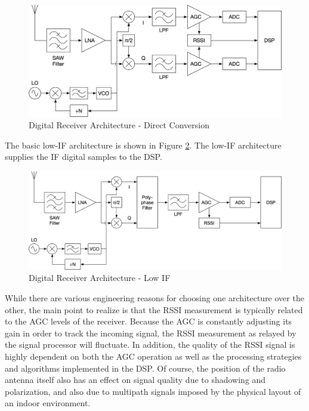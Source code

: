 \documentclass[12pt]{article}
\begin{document}
\begin{figure}[ht]
    \centering
    \includegraphics[width=1.0\textwidth]{RX-Arch-Direct.png}
    \caption{Digital Receiver Architecture - Direct Conversion}
    \label{fig:rx-arch-direct}
\end{figure}

The basic low-IF architecture is shown in Figure \ref{fig:rx-arch-low-if}. The low-IF
architecture supplies the IF digital samples to the DSP.

\begin{figure}[ht]
    \centering
    \includegraphics[width=1.0\textwidth]{RX-Arch-Low-IF.png}
    \caption{Digital Receiver Architecture - Low IF}
    \label{fig:rx-arch-low-if}
\end{figure}

While there are various engineering reasons for choosing one architecture over the other,
the main point to realize is that the RSSI measurement is typically related to the AGC
levels of the receiver. Because the AGC is constantly adjusting its gain in order to
track the incoming signal, the RSSI measurement as relayed by the signal processor will
fluctuate. In addition, the quality of the RSSI signal is highly dependent on both the
AGC operation as well as the processing strategies and algorithms implemented in the DSP.
Of course, the position of the radio antenna itself also has an effect on signal quality
due to shadowing and polarization, and also due to multipath signals imposed by the
physical layout of an indoor environment.
\end{document}

